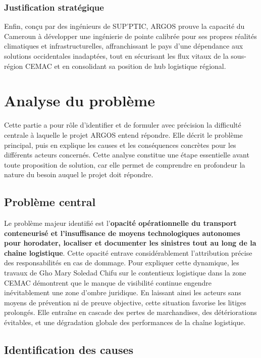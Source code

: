 \subsubsection*{Justification stratégique}
Enfin, conçu par des ingénieurs de SUP'PTIC, ARGOS prouve la capacité du Cameroun à développer une ingénierie de pointe calibrée pour ses propres réalités climatiques et infrastructurelles, affranchissant le pays d'une dépendance aux solutions occidentales inadaptées, tout en sécurisant les flux vitaux de la sous-région CEMAC et en consolidant sa position de hub logistique régional.

\medskip
\section{Analyse du problème}

Cette partie a pour rôle d'identifier et de formuler avec précision la difficulté centrale à laquelle le projet ARGOS entend répondre. Elle décrit le problème principal, puis en explique les causes et les conséquences concrètes pour les différents acteurs concernés. Cette analyse constitue une étape essentielle avant toute proposition de solution, car elle permet de comprendre en profondeur la nature du besoin auquel le projet doit répondre.

\subsection{Problème central}
Le problème majeur identifié est l'\textbf{opacité opérationnelle du transport conteneurisé et l'insuffisance de moyens technologiques autonomes pour horodater, localiser et documenter les sinistres tout au long de la chaîne logistique}. 
Cette opacité entrave considérablement l'attribution précise des responsabilités en cas de dommage. Pour expliquer cette dynamique, les travaux de Gho Mary Soledad Chifu sur le contentieux logistique dans la zone CEMAC démontrent que le manque de visibilité continue engendre inévitablement une zone d'ombre juridique.
En laissant ainsi les acteurs sans moyens de prévention ni de preuve objective, cette situation favorise les litiges prolongés. Elle entraîne en cascade des pertes de marchandises, des détériorations évitables, et une dégradation globale des performances de la chaîne logistique.

\subsection{Identification des causes}


